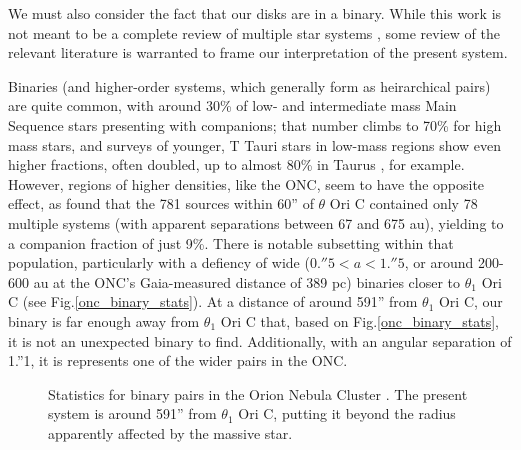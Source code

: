 



We must also consider the fact that our disks are in a binary. While this work is not meant to be a complete review of multiple star systems \citep[the interested reader is referred to ][for a more comprehensive review]{Duchene2013}, some review of the relevant literature is warranted to frame our interpretation of the present system.

Binaries (and higher-order systems, which generally form as heirarchical pairs) are quite common, with around 30\% of low- and intermediate mass Main Sequence stars presenting with companions; that number climbs to 70\% for high mass stars\citep{Sana2012}, and surveys of younger, T Tauri stars in low-mass regions show even higher fractions, often doubled, up to almost 80\% in Taurus \citep{Kraus2011}, for example. However, regions of higher densities, like the ONC, seem to have the opposite effect, as \citet{Reipurth2007} found that the 781 sources within 60'' of $\theta$ Ori C contained only 78 multiple systems (with apparent separations between 67 and 675 au), yielding to a companion fraction of just 9\%. There is notable subsetting within that population, particularly with a defiency of wide ($0.''5 < a < 1.''5$, or around 200-600 au at the ONC's Gaia-measured distance of 389 pc) binaries closer to $\theta_1$ Ori C (see Fig.\ref{onc_binary_stats}). At a distance of around 591'' from $\theta_1$ Ori C, our binary is far enough away from $\theta_1$ Ori C that, based on Fig.\ref{onc_binary_stats}, it is not an unexpected binary to find. Additionally, with an angular separation of 1.''1, it is represents one of the wider pairs in the ONC.


\begin{figure}[h]
  \hspace*{\fill}%
  \hspace*{\fill}%
  \caption{Statistics for binary pairs in the Orion Nebula Cluster \citep{Reipurth2007}. The present system is around 591'' from $\theta_1$ Ori C, putting it beyond the radius apparently affected by the massive star.}
  \label{fig:onc_binary_stats}
\end{figure}



